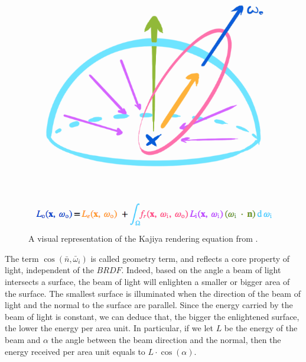 \documentclass{PoliMi_MasterThesis}
\begin{document}
\begin{figure}[H]
    \centering
    \includegraphics[width=\textwidth*\real{0.5}]{Images/kajiya_visual.png}
    \caption{A visual representation of the Kajiya rendering equation from \cite{kajiya_equation_drawing}.}
    \label{fig:rendering_equation}
\end{figure}

The term $\cos(\bar{n}, \bar{\omega}_i)$ is called geometry term, and reflects a core property of light, independent of the $BRDF$. Indeed, based on the angle a beam of light intersects a surface, the beam of light will enlighten a smaller or bigger area of the surface. The smallest surface is illuminated when the direction of the beam of light and the normal to the surface are parallel. Since the energy carried by the beam of light is constant, we can deduce that, the bigger the enlightened surface, the lower the energy per area unit. In particular, if we let $L$ be the energy of the beam and $\alpha$ the angle between the beam direction and the normal, then the energy received per area unit equals to $L\cdot \cos(\alpha)$. 
\end{document}
